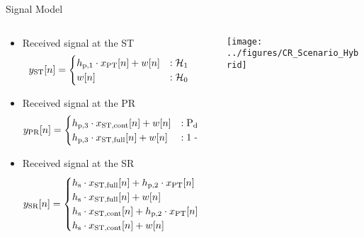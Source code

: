 \documentclass[12pt]{beamer}
\newcommand{\fs}[2]{\fontsize{#1 pt}{#2}\selectfont}
\begin{document}
\begin{frame}{Signal Model}
        \fs{8}{8}
        \begin{columns}[t]
                \begin{column}{0.51 \paperwidth}
                \vspace{-0.4cm}
                \begin{itemize}
                     \item Received signal at the ST
                        \begin{equation*}
			y_{\text{ST}}[n] = 
				\begin{cases}
				h_{\text{p,1}} \cdot x_{\text{PT}}[n] + w[n] & : \mathcal{H}_1 \\
				w[n] & :\mathcal{H}_0
				\end{cases}
                        \end{equation*}
                     \item Received signal at the PR
                        \begin{equation*}
                        y_{\text{PR}}[n] = 
			\begin{cases}
			h_{\text{p,3}} \cdot x_{\text{ST,cont}}[n] + w[n] & : \text{P}_{\text{d}} \\
			h_{\text{p,3}} \cdot x_{\text{ST,full}}[n] + w[n] & : 1- \text{P}_{\text{d}} 
			\end{cases}
			\end{equation*}
                     \item Received signal at the SR
                        \begin{equation*}
                                y_{\text{SR}}[n] = 
				\begin{cases}
					h_{\text{s}} \cdot x_{\text{ST,full}}[n] + h_{\text{p,2}} \cdot x_{\text{PT}}[n] + w[n] &: 1 - \text{P}_{\text{d}} \\
					h_{\text{s}} \cdot x_{\text{ST,full}}[n] + w[n] &: 1 - \text{P}_{\text{fa}} \\
					h_{\text{s}} \cdot x_{\text{ST,cont}}[n] + h_{\text{p,2}} \cdot x_{\text{PT}}[n] + w[n] &: \text{P}_{\text{d}} \\
					h_{\text{s}} \cdot x_{\text{ST,cont}}[n] + w[n] &: \text{P}_{\text{fa}} 
					\end{cases}
                        \end{equation*}
                \end{itemize}
                \end{column}
                \begin{column}{0.06 \paperwidth}
                \end{column}
                \begin{column}{0.43 \paperwidth}
                \begin{center}
                        \texttt{[image: ../figures/CR\_Scenario\_Hybrid]}
                \end{center}
                \end{column}
        \end{columns}
\end{frame}
\end{document}
